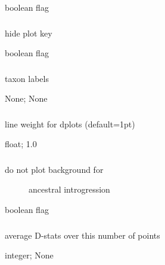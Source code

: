 \documentclass[letterpaper,12pt,english]{sphinxmanual}
\begin{document}
 boolean flag


\subsubsection{}
\label{\detokenize{prog_desc:plot-hidekey}}
 hide plot key

 boolean flag


\subsubsection{}
\label{\detokenize{prog_desc:plot-labels}}
 taxon labels

 None;  None


\subsubsection{}
\label{\detokenize{prog_desc:plot-lineweight}}
 line weight for dplots (default=1pt)

 float;  1.0


\subsubsection{}
\label{\detokenize{prog_desc:plot-noanc}}\begin{description}
\item[{ do not plot background for}] \leavevmode
ancestral introgression

\end{description}

 boolean flag


\subsubsection{}
\label{\detokenize{prog_desc:plot-smooth}}
 average D-stats over this number of points

 integer;  None
\end{document}
